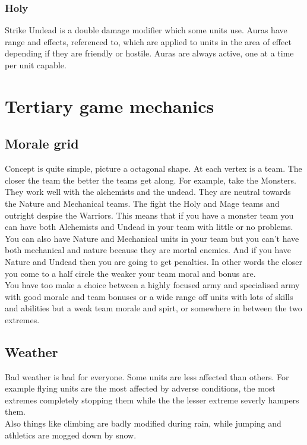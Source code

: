 \documentclass[a4paper,twocolumn]{article}
\begin{document}
\subsubsection{Holy}
Strike Undead is a double damage modifier which some units use.
Auras have range and effects, referenced to, which are applied to units in the area of effect depending if they are friendly or hostile. Auras are always active, one at a time per unit capable.

\newpage \section{Tertiary game mechanics}

\subsection{Morale grid}

Concept is quite simple, picture a octagonal shape. At each vertex is a team. The closer the team the better the teams get along. For example, take the Monsters. They work well with the alchemists and the undead. They are neutral towards the Nature and Mechanical teams. The fight the Holy and Mage teams and outright despise the Warriors. This means that if you have a monster team you can have both Alchemists and Undead in your team with little or no problems.\\
You can also have Nature and Mechanical units in your team but you can't have both mechanical and nature because they are mortal enemies. And if you have Nature and Undead then you are going to get penalties. In other words the closer you come to a half circle the weaker your team moral and bonus are.\\
You have too make a choice between a highly focused army and specialised army with good morale and team bonuses or a wide range off units with lots of skills and abilities but a weak team morale and spirt, or somewhere in between the two extremes.

\subsection{Weather}

Bad weather is bad for everyone. Some units are less affected than others. For example flying units are the most affected by adverse conditions, the most extremes completely stopping them while the the lesser extreme severly hampers them.\\
Also things like climbing are badly modified during rain, while jumping and athletics are mogged down by snow.\\
\end{document}
